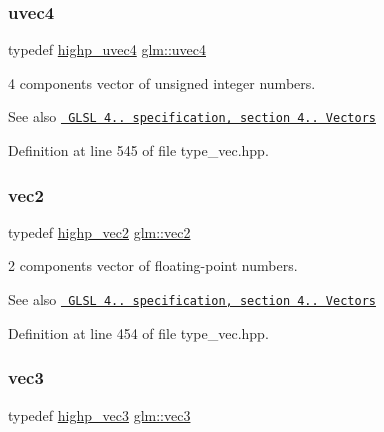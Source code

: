 \subsubsection{\texorpdfstring{uvec4}{uvec4}}
{\footnotesize\ttfamily typedef \mbox{\hyperlink{group__core__precision_gaced82ea2e726f079d4d72cf180a75b8b}{highp\+\_\+uvec4}} \mbox{\hyperlink{group__core__types_ga1c426d19627b32b14f0089f7f4ba7b1d}{glm\+::uvec4}}}

4 components vector of unsigned integer numbers.

\begin{DoxySeeAlso}{See also}
\href{http://www.opengl.org/registry/doc/GLSLangSpec.4.20.8.pdf}{\texttt{ G\+L\+SL 4.. specification, section 4.. Vectors}} 
\end{DoxySeeAlso}


Definition at line 545 of file type\+\_\+vec.\+hpp.

\mbox{\label{group__core__types_gaa1618f51db67eaa145db101d8c8431d8}} 
\subsubsection{\texorpdfstring{vec2}{vec2}}
{\footnotesize\ttfamily typedef \mbox{\hyperlink{group__core__precision_ga84532f0e0c7e2af99edd65dc182aba51}{highp\+\_\+vec2}} \mbox{\hyperlink{group__core__types_gaa1618f51db67eaa145db101d8c8431d8}{glm\+::vec2}}}

2 components vector of floating-\/point numbers.

\begin{DoxySeeAlso}{See also}
\href{http://www.opengl.org/registry/doc/GLSLangSpec.4.20.8.pdf}{\texttt{ G\+L\+SL 4.. specification, section 4.. Vectors}} 
\end{DoxySeeAlso}


Definition at line 454 of file type\+\_\+vec.\+hpp.

\mbox{\label{group__core__types_ga1c47e8b3386109bc992b6c48e91b0be7}} 
\subsubsection{\texorpdfstring{vec3}{vec3}}
{\footnotesize\ttfamily typedef \mbox{\hyperlink{group__core__precision_ga1ef07d2502ea09b1e63998813a3d4330}{highp\+\_\+vec3}} \mbox{\hyperlink{group__core__types_ga1c47e8b3386109bc992b6c48e91b0be7}{glm\+::vec3}}}

